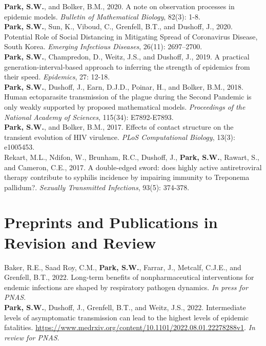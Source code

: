 \documentclass[11pt]{article} %
\begin{document}
 \textbf{Park, S.W.}, and Bolker, B.M., 2020. A note on observation processes in epidemic models. \textit{Bulletin of Mathematical Biology}, 82(3): 1-8.\\

 \textbf{Park, S.W.}, Sun, K., Viboud, C., Grenfell, B.T., and Dushoff, J., 2020. Potential Role of Social Distancing in Mitigating Spread of Coronavirus Disease, South Korea. \textit{Emerging Infectious Diseases}, 26(11): 2697–2700.\\

 \textbf{Park, S.W.}, Champredon, D., Weitz, J.S., and Dushoff, J., 2019. A practical generation-interval-based approach to inferring the strength of epidemics from their speed. \textit{Epidemics}, 27: 12-18.\\

 \textbf{Park, S.W.}, Dushoff, J., Earn, D.J.D., Poinar, H., and Bolker, B.M., 2018. Human
ectoparasite transmission of the plague during the Second Pandemic is only weakly
supported by proposed mathematical models. \textit{Proceedings of the National Academy of Sciences}, 115(34): E7892-E7893.\\

 \textbf{Park, S.W.}, and Bolker, B.M., 2017. Effects of contact structure on the transient
evolution of HIV virulence. \textit{PLoS Computational Biology}, 13(3): e1005453.\\

 Rekart, M.L., Ndifon, W., Brunham, R.C., Dushoff, J., \textbf{Park, S.W.}, Rawart, S., and
Cameron, C.E., 2017. A double-edged sword: does highly active antiretroviral therapy contribute to syphilis incidence by impairing immunity to Treponema pallidum?.
\textit{Sexually Transmitted Infections}, 93(5): 374-378.\\

\section*{Preprints and Publications in Revision and Review}

 Baker, R.E., Saad Roy, C.M., \textbf{Park, S.W.}, Farrar, J., Metcalf, C.J.E., and Grenfell, B.T., 2022. Long-term benefits of nonpharmaceutical interventions for endemic infections are shaped by respiratory pathogen dynamics. \textit{In press for PNAS}.\\

 \textbf{Park, S.W.}, Dushoff, J., Grenfell, B.T., and Weitz, J.S., 2022. Intermediate levels of asymptomatic transmission can lead to the highest levels of epidemic fatalities. \url{https://www.medrxiv.org/content/10.1101/2022.08.01.22278288v1}. \textit{In review for PNAS}.\\
\end{document}
